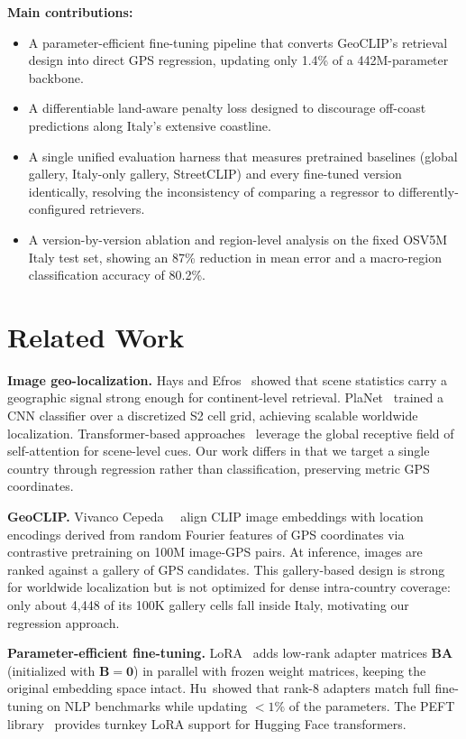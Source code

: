 \documentclass[10pt,twocolumn,letterpaper]{article}
\begin{document}
\noindent\textbf{Main contributions:}
\begin{itemize}
\itemsep0.2em
\item A parameter-efficient fine-tuning pipeline that converts GeoCLIP's
      retrieval design into direct GPS regression, updating only 1.4\% of a
      442M-parameter backbone.
\item A differentiable land-aware penalty loss designed to discourage
      off-coast predictions along Italy's extensive coastline.
\item A single unified evaluation harness that measures pretrained baselines
      (global gallery, Italy-only gallery, StreetCLIP) and every fine-tuned
      version identically, resolving the inconsistency of comparing a
      regressor to differently-configured retrievers.
\item A version-by-version ablation and region-level analysis on the fixed
      OSV5M Italy test set, showing an 87\% reduction in mean error and a
      macro-region classification accuracy of 80.2\%.
\end{itemize}

\section{Related Work}

\noindent\textbf{Image geo-localization.}
Hays and Efros~\cite{im2gps} showed that scene statistics carry a geographic
signal strong enough for continent-level retrieval.
PlaNet~\cite{planet} trained a CNN classifier over a discretized S2 cell grid,
achieving scalable worldwide localization.
Transformer-based approaches~\cite{translocator} leverage the global receptive
field of self-attention for scene-level cues.
Our work differs in that we target a single country through regression rather
than classification, preserving metric GPS coordinates.

\noindent\textbf{GeoCLIP.}
Vivanco Cepeda~\etal~\cite{geoclip} align CLIP image embeddings with location
encodings derived from random Fourier features of GPS coordinates via
contrastive pretraining on 100M image-GPS pairs.
At inference, images are ranked against a gallery of GPS candidates.
This gallery-based design is strong for worldwide localization but is not
optimized for dense intra-country coverage: only about 4{,}448 of its 100K
gallery cells fall inside Italy, motivating our regression approach.

\noindent\textbf{Parameter-efficient fine-tuning.}
LoRA~\cite{lora} adds low-rank adapter matrices $\mathbf{BA}$ (initialized
with $\mathbf{B}=\mathbf{0}$) in parallel with frozen weight matrices,
keeping the original embedding space intact.
Hu~\etal showed that rank-8 adapters match full fine-tuning on NLP benchmarks
while updating $<1\%$ of the parameters.
The PEFT library~\cite{peft} provides turnkey LoRA support for Hugging Face
transformers.
\end{document}
